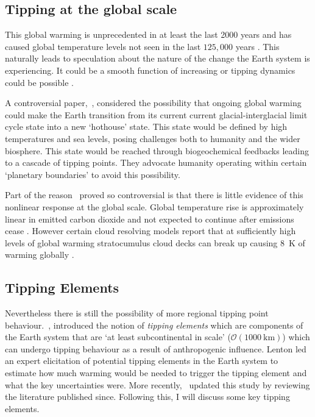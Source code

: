\subsection{Tipping at the global scale}
This global warming is unprecedented in at least the last 2000 years and has caused global temperature levels not seen in the last $125,000$ years \parencite{AR6}. This naturally leads to speculation
about the nature of the change the Earth system is experiencing. It could be a smooth function of increasing  or tipping dynamics could be possible \parencite{Broecker1987}.

A controversial paper,~\cite{Steffen2018}, considered the possibility that ongoing global warming could make the Earth transition from its current current glacial-interglacial limit cycle
state into a new `hothouse' state. This state would be defined by high temperatures and sea levels, posing challenges both to humanity and the wider biosphere. This state would be reached
through biogeochemical feedbacks leading to a cascade of tipping points. They advocate humanity operating within certain `planetary boundaries' \parencite{Rockstrom2009} to avoid this possibility.

Part of the reason~\cite{Steffen2018} proved so controversial is that there is little evidence of this nonlinear response at the global scale. Global temperature rise is approximately linear
in emitted carbon dioxide \parencite{Allen2009,Rogelj2019} and not expected to continue after emissions cease \parencite{MacDougall2020}. However certain cloud resolving models
report that at sufficiently high levels of global warming stratocumulus cloud decks can break up causing \SI{8}{\kelvin} of warming globally \parencite{Schneider2019}.

\subsection{Tipping Elements}

Nevertheless there is still the possibility of more regional tipping point behaviour.~\cite{Lenton2008}, introduced the notion of \emph{tipping elements} which
are components of the Earth system that are `at least subcontinental in scale' ($\mathcal{O}(\SI{1000}{\kilo\meter})$) which can undergo tipping behaviour as a result of
anthropogenic influence. Lenton led an expert elicitation of potential tipping elements in the Earth system to estimate how much warming would be needed to trigger the tipping element
and what the key uncertainties were. More recently,~\cite{ArmstrongMcKay2022} updated this study by reviewing the literature published since.  Following this, I will discuss some key tipping elements.

